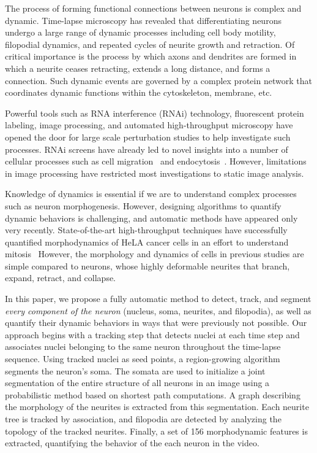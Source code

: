 

The process of forming functional connections
between neurons is complex and dynamic.
Time-lapse microscopy has revealed that
differentiating neurons undergo a large range of
dynamic processes including cell body motility,
filopodial dynamics, and repeated cycles of
neurite growth and retraction.  Of critical
importance is the process by which axons and
dendrites are formed in which a neurite ceases
retracting, extends a long distance, and forms a
connection. Such dynamic events are governed by a
complex protein network that coordinates dynamic
functions within the cytoskeleton, membrane, etc.

Powerful tools such as RNA interference (RNAi)
technology, fluorescent protein labeling, image
processing, and automated high-throughput
microscopy have opened the door for large scale
perturbation studies to help investigate such
processes. RNAi screens have already led to novel
insights into a number of cellular processes such
as cell migration~\cite{Bakal07} and
endocytosis~\cite{Collinet10}.  However,
limitations in image processing have restricted
most investigations to static image analysis.

Knowledge of dynamics is essential if we are to
understand complex processes such as neuron
morphogenesis.  However, designing algorithms to
quantify dynamic behaviors is challenging, and
automatic methods have appeared only very
recently. State-of-the-art high-throughput
techniques have successfully quantified
morphodynamics of HeLA cancer cells in an effort
to understand
mitosis~\cite{Held10,Neumann10}
However,
the morphology and dynamics of cells in previous
studies are simple compared to neurons, whose
highly deformable neurites that branch, expand,
retract, and collapse.


In this paper, we propose a fully automatic method
to detect, track, and segment {\em every component
  of the neuron} (nucleus, soma, neurites, and
filopodia), as well as quantify their dynamic
behaviors in ways that were previously not
possible. Our approach begins with a tracking step
that detects nuclei at each time step and
associates nuclei belonging to the same neuron
throughout the time-lapse sequence.  Using tracked
nuclei as seed points, a region-growing algorithm
segments the neuron's soma.  The somata are used
to initialize a joint segmentation of the entire
structure of all neurons in an image using a
probabilistic method based on shortest path
computations.  A graph describing the morphology
of the neurites is extracted from this
segmentation.  Each neurite tree is tracked by
association, and filopodia are detected by
analyzing the topology of the tracked neurites.
Finally, a set of 156 morphodynamic features is
extracted, quantifying the behavior of the each
neuron in the video.


